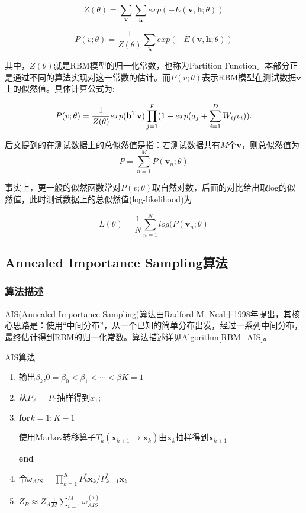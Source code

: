 \documentclass[11pt]{article}
\begin{document}
\[Z(\theta) = \sum_{\mathbf{v}}\sum_{\mathbf{h}} exp(-E(\mathbf{v},\mathbf{h};\theta))\]

\[P(v;\theta)=\frac{1}{Z(\theta)}\sum_{\mathbf{h}}exp(-E(\mathbf{v},\mathbf{h};\theta))\]

其中，$Z(\theta)$就是RBM模型的归一化常数，也称为Partition Function。本部分正是通过不同的算法实现对这一常数的估计。而$P(v;\theta)$表示RBM模型在测试数据$\mathbf{v}$上的似然值。具体计算公式为:

\[P(v;\theta)=\frac{1}{Z(\theta)}exp(\mathbf{b}^{\rm T}\mathbf{v})\prod_{j=1}^{F}(1+exp(a_{j}+\sum_{i=1}^{D}W_{ij}v_{i})).\]

后文提到的在测试数据上的总似然值是指：若测试数据共有$M$个$\mathbf{v}$，则总似然值为
\[P=\sum_{n=1}^{M}P(\mathbf{v}_{n};\theta)\]

事实上，更一般的似然函数常对$P(v;\theta)$取自然对数\cite{AIS}，后面的对比给出取log的似然值，此时测试数据上的总似然值(log-likelihood)为

\[L(\theta) = \frac{1}{N}\sum_{n=1}^{N}log(P(\mathbf{v}_{n};\theta)\]


\subsection{Annealed Importance Sampling算法}
\subsubsection{算法描述}
AIS(Annealed Importance Sampling)算法由Radford M. Neal于1998年提出\cite{AIS_O}，其核心思路是：使用“中间分布”，从一个已知的简单分布出发，经过一系列中间分布，最终估计得到RBM的归一化常数。算法描述详见Algorithm\ref{RBM_AIS}。

\begin{algorithm}[t]
\caption{AIS算法} 
\begin{enumerate} 
  \item 输出$\beta_{k}$,$0 = \beta_{0}<\beta_{1}<\cdots<\beta{K} = 1$
  
  \item 从$P_{A} = P_{0}$抽样得到$x_{1}$;

  \item \textbf{for}$ k = 1:K-1$ 

  使用Markov转移算子$T_k(\textbf{x}_{k+1}\rightarrow\textbf{x}_{k})$由$\textbf{x}_{k}$抽样得到$\textbf{x}_{k+1}$

  \textbf{end}
 
  \item 令$\omega_{AIS} = \prod_{k = 1}^{K} P_{k}^{*}\textbf{x}_{k}/P_{k-1}^{*}\textbf{x}_{k}$
 
  \item $Z_{B}\approx Z_{A}\frac{1}{M}\sum_{i=1}^{M}\omega_{AIS}^{(i)}$

\end{enumerate} 
\label{RBM_AIS} 
\end{algorithm}
\end{document}
